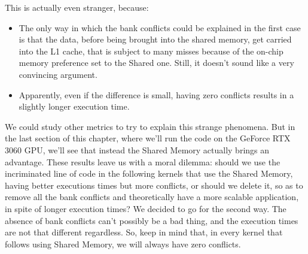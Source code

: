 \documentclass[12pt]{extarticle}
\begin{document}
This is actually even stranger, because:
\begin{itemize}
    \item The only way in which the bank conflicts could be explained in the first case is that the data, before being brought into the shared memory, get carried into the L1 cache, that is subject to many misses because of the on-chip memory preference set to the Shared one. Still, it doesn't sound like a very convincing argument.
    \item Apparently, even if the difference is small, having zero conflicts results in a slightly longer execution time.
\end{itemize}
We could study other metrics to try to explain this strange phenomena. But in the last section of this chapter, where we'll run the code on the GeForce RTX 3060 GPU, we'll see that instead the Shared Memory actually brings an advantage.\newline
These results leave us with a moral dilemma: should we use the incriminated line of code in the following kernels that use the Shared Memory, having better executions times but more conflicts, or should we delete it, so as to remove all the bank conflicts and theoretically have a more scalable application, in spite of longer execution times? We decided to go for the second way. The absence of bank conflicts can't possibly be a bad thing, and the execution times are not that different regardless. So, keep in mind that, in every kernel that follows using Shared Memory, we will always have zero conflicts.
\end{document}
